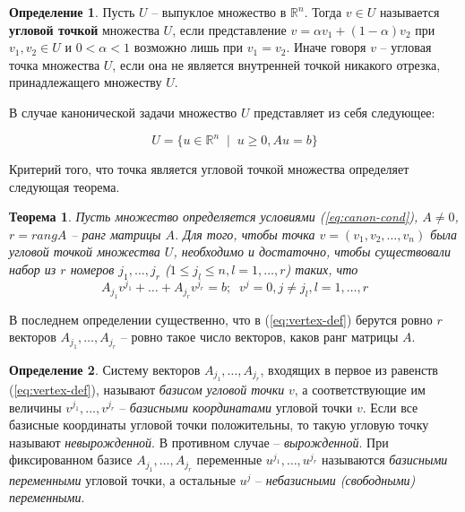 \documentclass[a4paper, 12pt, titlepage]{article}
\theoremstyle{definition}
\newtheorem{SmartDefinition}{Определение}
\theoremstyle{plain}
\newtheorem{SmartTheorem}{Теорема}
\theoremstyle{plain}
\begin{document}
\begin{SmartDefinition}
 Пусть $U$ -- выпуклое множество в $\mathbb{R}^{n}$. Тогда $v \in U$ называется
 \textbf{угловой точкой} множества $U$, если представление
 $v = \alpha v_{1} + (1 - \alpha) v_{2}$ при $v_{1}, v_{2} \in U$ и
 $0 < \alpha < 1$ возможно лишь при $v_{1} = v_{2}$. Иначе говоря $v$ -- угловая
 точка множества $U$, если она не является внутренней точкой никакого отрезка,
 принадлежащего множеству $U$.
\end{SmartDefinition}

В случае канонической задачи множество $U$ представляет из себя следующее:

\begin{equation}
\label{eq:canon-cond}
 U = \{u \in \mathbb{R}^{n} \;\; | \;\; u \geq 0, A u = b\}
\end{equation}

Критерий того, что точка является угловой точкой множества определяет следующая
теорема.

\begin{SmartTheorem}
 Пусть множество определяется условиями (\ref{eq:canon-cond}), $A \neq 0$,
 $r = rang A$ -- ранг матрицы $A$. Для того, чтобы точка
 $v = (v_{1}, v_{2}, \ldots, v_{n})$ была угловой точкой множества $U$,
 необходимо и достаточно, чтобы существовали набор из $r$ номеров
 $j_{1}, \ldots, j_{r}$ ($1 \leq j_{l} \leq n, l = 1, \ldots, r$) таких, что
 \begin{equation}
 \label{eq:vertex-def}
  A_{j_{1}} v^{j_{1}} + \ldots + A_{j_{r}} v^{j_{r}} = b;
  \;\; v^{j} = 0, j \neq j_{l}, l = 1, \ldots, r
 \end{equation}
\end{SmartTheorem}

В последнем определении существенно, что в (\ref{eq:vertex-def}) берутся ровно
$r$ векторов $A_{j_{1}}, \ldots, A_{j_{r}}$ -- ровно такое число векторов,
каков ранг матрицы $A$.

\begin{SmartDefinition}
 Систему векторов $A_{j_{1}}, \ldots, A_{j_{r}}$, входящих в первое из равенств
 (\ref{eq:vertex-def}), называют \textit{базисом угловой точки} $v$, а
 соответствующие им величины $v^{j_{1}}, \ldots, v^{j_{r}}$ --
 \textit{базисными координатами} угловой точки $v$. Если все базисные 
 координаты угловой точки положительны, то такую угловую точку называют
 \textit{невырожденной}. В противном случае -- \textit{вырожденной}. При
 фиксированном базисе $A_{j_{1}}, \ldots, A_{j_{r}}$ переменные
 $u^{j_{1}}, \ldots, u^{j_{r}}$ называются \textit{базисными переменными}
 угловой точки, а остальные $u^{j}$ -- \textit{небазисными (свободными)
 переменными}.
\end{SmartDefinition}
\end{document}
